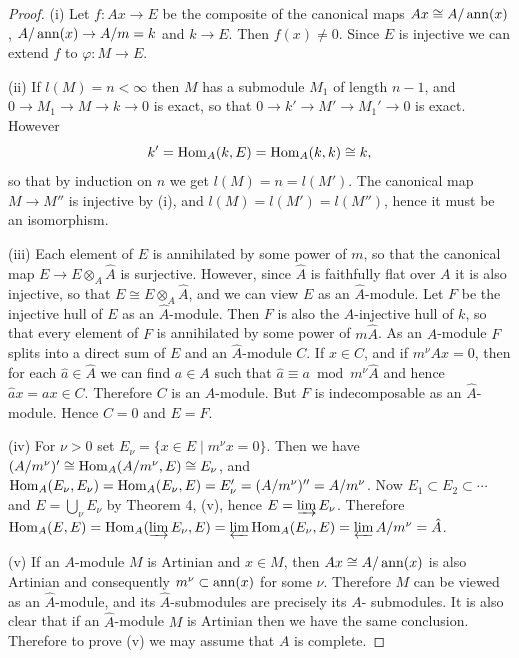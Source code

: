 \begin{proof}
(i) Let $f\colon Ax \to E$ be the composite of the canonical maps
$Ax \cong A/\operatorname{ann}(x)$, $A/\operatorname{ann}(x) \to A/m = k$ and $k \to E$. Then $f(x) \neq 0$. Since $E$ is
injective we can extend $f$ to $\varphi\colon M \to E$.

(ii) If $l(M) = n < \infty$ then $M$ has a submodule $M_1$ of length $n - 1$, and
$0 \to M_1 \to M \to k \to 0$ is exact, so that $0 \to k' \to M' \to M_1' \to 0$ is exact.
However
\[
  k' = \operatorname{Hom}_A(k, E) = \operatorname{Hom}_A(k, k) \cong k,
\]
so that by induction on $n$ we get $l(M) = n = l(M')$. The canonical map
$M \to M''$ is injective by (i), and $l(M) = l(M') = l(M'')$, hence it must be an
isomorphism.

(iii) Each element of $E$ is annihilated by some power of $m$, so that the
canonical map $E \to E \otimes_A \hat{A}$ is surjective. However, since $\hat{A}$ is faithfully
flat over $A$ it is also injective, so that $E \cong E \otimes_A \hat{A}$, and we can view $E$ as
an $\hat{A}$-module. Let $F$ be the injective hull of $E$ as an $\hat{A}$-module. Then $F$
is also the $A$-injective hull of $k$, so that every element of $F$ is annihilated
by some power of $m\hat{A}$. As an $A$-module $F$ splits into a direct sum of $E$
and an $\hat{A}$-module $C$. If $x \in C$, and if $m^\nu Ax = 0$, then for each $\hat{a} \in \hat{A}$ we
can find $a \in A$ such that $\hat{a} \equiv a \bmod m^\nu\hat{A}$ and hence $\hat{a}x = ax \in C$.
Therefore $C$ is an $A$-module. But $F$ is indecomposable as an $\hat{A}$-module.
Hence $C = 0$ and $E = F$.

(iv) For $\nu > 0$ set $E_\nu = \{x \in E \mid m^\nu x = 0\}$. Then we have $(A/m^\nu)' \cong
\operatorname{Hom}_A(A/m^\nu, E) \cong E_\nu$, and $\operatorname{Hom}_A(E_\nu, E_\nu) = \operatorname{Hom}_A(E_\nu, E) = E'_\nu = (A/m^\nu)'' =
A/m^\nu$. Now $E_1 \subset E_2 \subset \cdots$ and $E = \bigcup_\nu E_\nu$ by Theorem 4, (v), hence $E =
\varinjlim E_\nu$. Therefore $\operatorname{Hom}_A(E, E) = \operatorname{Hom}_A(\varinjlim E_\nu, E) = \varprojlim \operatorname{Hom}_A(E_\nu, E) =
\varprojlim A/m^\nu = \hat{A}$.

(v) If an $A$-module $M$ is Artinian and $x \in M$, then $Ax \cong A/\operatorname{ann}(x)$ is also
Artinian and consequently $m^\nu \subset \operatorname{ann}(x)$ for some $\nu$. Therefore $M$ can be
viewed as an $\hat{A}$-module, and its $\hat{A}$-submodules are precisely its $A$-
submodules. It is also clear that if an $\hat{A}$-module $M$ is Artinian then we have
the same conclusion. Therefore to prove (v) we may assume that $A$ is
complete.


\end{proof}
